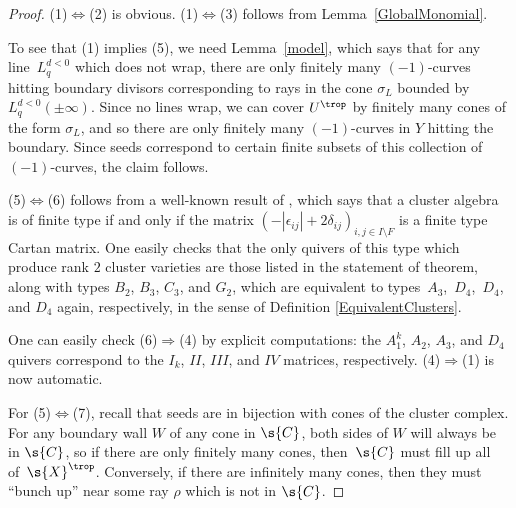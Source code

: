 \begin{proof}(1)$\Leftrightarrow$(2) is obvious. (1)$\Leftrightarrow$(3) follows from Lemma~\ref{GlobalMonomial}.

To see that (1) implies (5), we need Lemma~\ref{model}, which says that for any line~$L_q^{d<0}$ which does not wrap, there are only finitely many $(-1)$-curves hitting boundary divisors corresponding to rays in the cone $\sigma_{L}$ bounded by $L_q^{d<0}(\pm \infty)$. Since no lines wrap, we can cover $U^{\trop}$ by finitely many cones of the form $\sigma_{L}$, and so there are only finitely many $(-1)$-curves in $Y$ hitting the boundary. Since seeds correspond to certain finite subsets of this collection of $(-1)$-curves, the claim follows.

(5)$\Leftrightarrow$(6) follows from a well-known result of \cite{FZ2}, which says that a cluster algebra is of finite type if and only if the matrix $(-|\epsilon_{ij}|+2\delta_{ij})_{i,j\in I\setminus F}$ is a finite type Cartan matrix. One easily checks that the only quivers of this type which produce rank $2$ cluster varieties are those listed in the statement of theorem, along with types $B_2$, $B_3$, $C_3$, and $G_2$, which are equivalent to types~$A_3$,~$D_4$,~$D_4$, and $D_4$ again, respectively, in the sense of Definition \ref{EquivalentClusters}.

 One can easily check (6)$\Rightarrow$(4) by explicit computations: the $A_1^k$, $A_2$, $A_3$, and $D_4$ quivers correspond to the $I_k$, $II$, $III$, and $IV$ matrices, respectively. (4)$\Rightarrow$(1) is now automatic.

For (5)$\Leftrightarrow$(7), recall that seeds are in bijection with cones of the cluster complex. For any boundary wall $W$ of any cone in $\s{C}$, both sides of $W$ will always be in $\s{C}$, so if there are only finitely many cones, then~$\s{C}$ must fill up all of~$\s{X}^{\trop}$. Conversely, if there are infinitely many cones, then they must ``bunch up'' near some ray $\rho$ which is not in $\s{C}$.
\end{proof}

